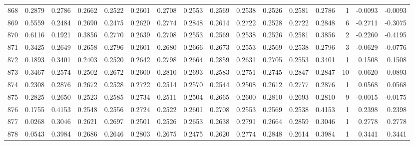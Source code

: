 \begin{tabular}{lrrrrrrrrrrrrrrr}
868 &      0.2879 &  0.2786 &  0.2662 &  0.2522 &  0.2601 &  0.2708 &  0.2553 &  0.2569 &  0.2538 &  0.2526 &   0.2581 &     0.2786 &      1 &                   -0.0093 &                    -0.0093 \\
869 &      0.5559 &  0.2484 &  0.2690 &  0.2475 &  0.2620 &  0.2774 &  0.2848 &  0.2614 &  0.2722 &  0.2528 &   0.2722 &     0.2848 &      6 &                   -0.2711 &                    -0.3075 \\
870 &      0.6116 &  0.1921 &  0.3856 &  0.2770 &  0.2639 &  0.2708 &  0.2553 &  0.2569 &  0.2538 &  0.2526 &   0.2581 &     0.3856 &      2 &                   -0.2260 &                    -0.4195 \\
871 &      0.3425 &  0.2649 &  0.2658 &  0.2796 &  0.2601 &  0.2680 &  0.2666 &  0.2673 &  0.2553 &  0.2569 &   0.2538 &     0.2796 &      3 &                   -0.0629 &                    -0.0776 \\
872 &      0.1893 &  0.3401 &  0.2403 &  0.2520 &  0.2642 &  0.2798 &  0.2664 &  0.2859 &  0.2631 &  0.2705 &   0.2553 &     0.3401 &      1 &                    0.1508 &                     0.1508 \\
873 &      0.3467 &  0.2574 &  0.2502 &  0.2672 &  0.2600 &  0.2810 &  0.2693 &  0.2583 &  0.2751 &  0.2745 &   0.2847 &     0.2847 &     10 &                   -0.0620 &                    -0.0893 \\
874 &      0.2308 &  0.2876 &  0.2672 &  0.2528 &  0.2722 &  0.2514 &  0.2570 &  0.2544 &  0.2508 &  0.2612 &   0.2777 &     0.2876 &      1 &                    0.0568 &                     0.0568 \\
875 &      0.2825 &  0.2650 &  0.2523 &  0.2585 &  0.2734 &  0.2511 &  0.2504 &  0.2665 &  0.2600 &  0.2810 &   0.2693 &     0.2810 &      9 &                   -0.0015 &                    -0.0175 \\
876 &      0.1755 &  0.4153 &  0.2548 &  0.2556 &  0.2724 &  0.2522 &  0.2601 &  0.2708 &  0.2553 &  0.2569 &   0.2538 &     0.4153 &      1 &                    0.2398 &                     0.2398 \\
877 &      0.0268 &  0.3046 &  0.2621 &  0.2697 &  0.2501 &  0.2526 &  0.2653 &  0.2638 &  0.2791 &  0.2664 &   0.2859 &     0.3046 &      1 &                    0.2778 &                     0.2778 \\
878 &      0.0543 &  0.3984 &  0.2686 &  0.2646 &  0.2803 &  0.2675 &  0.2475 &  0.2620 &  0.2774 &  0.2848 &   0.2614 &     0.3984 &      1 &                    0.3441 &                     0.3441 \\

\end{tabular}
